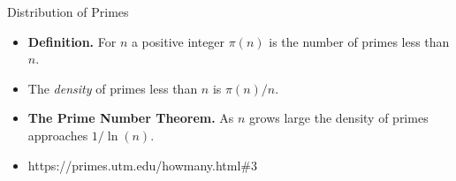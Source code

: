 \documentclass[handout]{beamer}
\begin{document}
\begin{frame}{Distribution of Primes}

\begin{itemize}
  \item \textbf{Definition.} For $n$ a positive integer $\pi(n)$ is the number
  of primes less than $n$.
  \item The \emph{density} of primes less than $n$ is $\pi(n)/n$.
  \item \textbf{The Prime Number Theorem.} As $n$ grows large the density of
  primes approaches $1/\ln(n)$.
  \item https://primes.utm.edu/howmany.html\#3
\end{itemize}

\end{frame}
\end{document}
